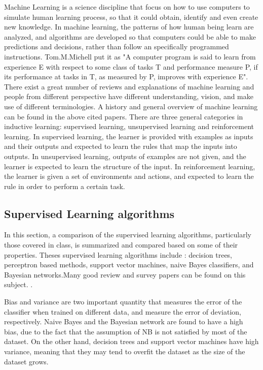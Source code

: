 \documentclass[11pt]{article}
\begin{document}
Machine Learning is a science discipline that focus on how to use computers to simulate human learning process, so that it could obtain, identify and even create new knowledge. In machine learning, the patterns of how human being learn are analyzed, and algorithms are developed so that computers could be able to make predictions and decisions, rather than follow an specifically programmed instructions. Tom.M.Michell put it as "A computer program is said to learn from experience E with respect to some class of tasks T and performance measure P, if its performance at tasks in T, as measured by P, improves with experience E"\cite{anderson1986machine}. There exist a great number of reviews and explanations of machine learning \cite{dutton1997review}\cite{lopez1998machine} and people from different perspective have different understanding, vision, and make use of different terminologies. A history and general overview of machine learning can be found in the above cited papers. There are three general categories in inductive learning: supervised learning, unsupervised learning and reinforcement learning\cite{russell1995modern}. In supervised learning, the learner is provided with examples as inputs and their outputs and expected to learn the rules that map the inputs into outputs. In unsupervised learning, outputs of examples are not given, and the learner is expected to learn the structure of the input. In reinforcement learning, the learner is given a set of environments and actions, and expected to learn the rule in order to perform a certain task.\cite{kotsiantis2007supervised}

\subsection{Supervised Learning algorithms}
 In this section, a comparison of the supervised learning algorithms, particularly those covered in class, is summarized and compared based on some of their properties. Theses supervised learning algorithms include : decision trees, perceptron based methods, support vector machines, naive Bayes classifiers, and Bayesian networks.Many good review and survey papers can be found on this subject. \cite{kotsiantis2007supervised}\cite{dutton1997review}\cite{lopez1998machine}\cite{michie1994machine}.

Bias and variance are two important quantity that measures the error of the classifier when trained on different data, and measure the error of deviation, respectively. Naive Bayes and the Bayesian network are found to have a high bias, due to the fact that the assumption of NB is not satisfied by most of the dataset. On the other hand, decision trees and support vector machines have high variance, meaning that they may tend to overfit the dataset as the size of the dataset grows. 
\end{document}
